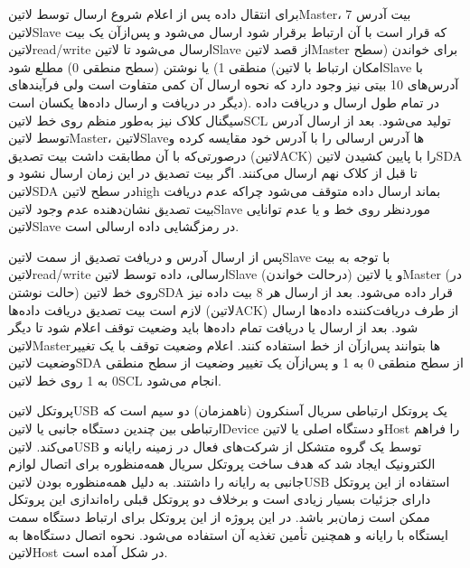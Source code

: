 برای انتقال داده پس از اعلام شروع ارسال توسط ‌لاتین{Master}، 7 بیت آدرس ‌لاتین{Slave} که قرار است با آن ارتباط برقرار شود ارسال می‌شود و پس‌ازآن یک بیت ‌لاتین{read/write} ارسال می‌شود تا ‌لاتین{Slave} از قصد ‌لاتین{Master} برای خواندن (سطح منطقی 1) یا نوشتن (سطح منطقی 0) مطلع شود (امکان ارتباط با ‌لاتین{Slave} با آدرس‌های 10 بیتی نیز وجود دارد که نحوه ارسال آن کمی متفاوت است ولی فرآیندهای دیگر در دریافت و ارسال داده‌ها یکسان است). در تمام طول ارسال و دریافت داده سیگنال کلاک نیز به‌طور منظم روی خط ‌لاتین{SCL} تولید می‌شود. بعد از ارسال آدرس توسط ‌لاتین{Master}، ‌لاتین{Slave}ها آدرس ارسالی را با آدرس خود مقایسه کرده و درصورتی‌که با آن مطابقت داشت بیت تصدیق (‌لاتین{ACK}) را با پایین کشیدن ‌لاتین{SDA} تا قبل از کلاک نهم ارسال می‌کنند. اگر بیت تصدیق در این زمان ارسال نشود و ‌لاتین{SDA} در سطح ‌لاتین{high} بماند ارسال داده متوقف می‌شود چراکه عدم دریافت بیت تصدیق نشان‌دهنده عدم وجود ‌لاتین{Slave} موردنظر روی خط و یا عدم توانایی ‌لاتین{Slave} در رمزگشایی داده ارسالی است. 

پس از ارسال آدرس و دریافت تصدیق از سمت ‌لاتین{Slave} با توجه به بیت ‌لاتین{read/write} ارسالی، داده توسط ‌لاتین{Slave} (درحالت خواندن) و یا ‌لاتین{Master} (در حالت نوشتن) روی خط ‌لاتین{SDA} قرار داده می‌شود. بعد از ارسال هر 8 بیت داده نیز لازم است بیت تصدیق دریافت داده‌ها (‌لاتین{ACK}) از طرف دریافت‌کننده داده‌ها ارسال شود. بعد از ارسال یا دریافت تمام داده‌ها باید وضعیت توقف اعلام شود تا دیگر ‌لاتین{Master}ها بتوانند پس‌ازآن از خط استفاده کنند. اعلام وضعیت توقف با یک تغییر وضعیت ‌لاتین{SDA} از سطح منطقی 0 به 1 و پس‌ازآن یک تغییر وضعیت از سطح منطقی 0 به 1  روی خط ‌لاتین{SCL} انجام می‌شود.


پروتکل ‌لاتین{USB} یک پروتکل ارتباطی سریال آسنکرون (ناهمزمان) دو سیم است که ارتباطی بین چندین دستگاه جانبی یا ‌لاتین{Device} و دستگاه اصلی یا ‌لاتین{Host} را فراهم می‌کند. ‌لاتین{USB} توسط یک گروه متشکل از شرکت‌های فعال در زمینه رایانه و الکترونیک ایجاد شد که هدف ساخت پروتکل سریال همه‌منظوره برای اتصال لوازم جانبی به رایانه را داشتند. به دلیل همه‌منظوره بودن ‌لاتین{USB} استفاده از این پروتکل دارای جزئیات بسیار زیادی است و برخلاف دو پروتکل قبلی راه‌اندازی این پروتکل ممکن است زمان‌بر باشد. در این پروژه از این پروتکل برای ارتباط دستگاه سمت ایستگاه با رایانه و همچنین تأمین تغذیه آن استفاده می‌شود. نحوه اتصال دستگاه‌ها به ‌لاتین{Host} در شکل  آمده است.

